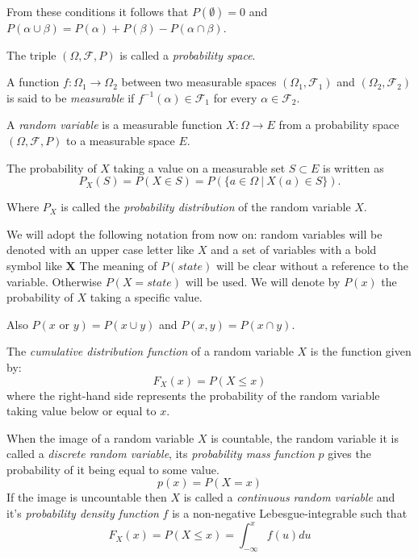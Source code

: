 From these conditions it follows that \(P(\emptyset) = 0\) and \(P(\alpha \cup \beta)
= P(\alpha) + P(\beta) - P(\alpha \cap \beta)\).

The triple \((\Omega, \mathcal{F}, P)\) is called a \emph{probability space}.

\begin{definition}
A function \(f:\Omega_1 \to \Omega_2\) between two
measurable spaces \((\Omega_1, \mathcal{F}_1)\) and \((\Omega_2, \mathcal{F}_2)\) is said to be \emph{measurable} if \(f^{-1}(\alpha) \in \mathcal{F}_1\) for every \(\alpha \in \mathcal{F}_2\).
\end{definition}

\begin{definition}
A \emph{random variable} is a measurable function \(X:\Omega \to E\) from a probability
space \((\Omega, \mathcal{F}, P)\) to a measurable space \(E\).

The probability of \(X\) taking a value on a measurable set \(S \subset E\) is
written as
\[
P_X(S) = P(X \in S) = P(\{a \in \Omega \ | \ X(a) \in S \}).
\]

Where \(P_X\) is called the \emph{probability distribution} of the random
variable \(X\).
\end{definition}

We will adopt the following notation from now on: random variables will be
denoted with an upper case letter like \(X\) and a set of variables with a
bold symbol like \(\bm{X}\) The meaning of \(P(state)\) will be clear without a reference to the variable.
Otherwise \(P(X = state)\) will be used.
We will denote by \(P(x)\) the probability of \(X\) taking a specific value.

Also \(P(x \text{ or } y) = P(x \cup y)\) and \(P(x,y) = P(x \cap y)\).


\begin{definition}
The \emph{cumulative distribution function} of a random variable \(X\) is the
function given by:
\[
F_X (x) = P(X \leq x)
\]
where the right-hand side represents the probability of the random variable
taking value below or equal to \(x\).
\end{definition}

\begin{definition}
When the image of a random variable \(X\) is countable, the random variable it
is called a
\emph{discrete random variable}, its \emph{probability mass function} \(p\) gives the
probability of it being equal to some value.
\[
p(x) = P(X = x)
\]
If the image is uncountable then \(X\) is called a \emph{continuous random
  variable} and it's \emph{probability density function} \(f\) is a non-negative
Lebesgue-integrable such that
\[
F_X(x) = P(X \leq x) = \int_{-\infty}^x f(u) du
\]
\end{definition}

